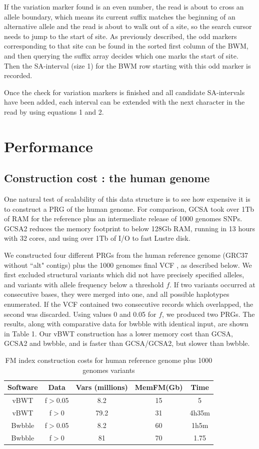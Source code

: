 \documentclass[runningheads,a4paper]{llncs}
\begin{document}
If the variation marker found is an even number, the read is about to cross an allele boundary, which means its current suffix matches the beginning of an alternative allele and the read is about to walk out of a site, so the search cursor needs to jump to the start of site. As previously described, the odd markers corresponding to that site can be found in the sorted first column of the BWM, and then querying the suffix array decides which one marks the start of site. Then the SA-interval (size 1) for the BWM row starting with this odd marker is recorded.

Once the check for variation markers is finished and all candidate SA-intervals have been added, each interval can be extended with the next character in the read by using equations 1 and 2.

\section{Performance}
\subsection{Construction cost : the human genome}
One natural test of scalability of this data structure is to see how expensive it is to construct a PRG of the human genome. For comparison, GCSA took over 1Tb of RAM for the reference plus an intermediate release of 1000 genomes SNPs. GCSA2 reduces the memory footprint to below 128Gb RAM, running in 13 hours with 32 cores, and using  over 1Tb of I/O to fast Lustre disk. 

We  constructed four different PRGs from the human reference genome (GRC37 without ``alt" contigs) plus the 1000 genomes final VCF \cite{1000g}, as described below. We first  excluded structural variants which did not have precisely specified alleles, and variants with allele frequency below a threshold $f$. If two variants occurred at consecutive bases, they were merged into one, and all possible haplotypes enumerated. If the VCF contained two consecutive records which overlapped, the second was discarded. Using values 0 and 0.05 for $f$, we produced two PRGs. The results, along with comparative data for bwbble with identical input,  are shown in Table 1. Our vBWT construction has a lower  memory cost than GCSA, GCSA2 and bwbble, and is faster than GCSA/GCSA2, but slower than bwbble. 

\begin{table}
\caption{FM index construction costs for human reference genome plus 1000 genomes variants}
\centering
\begin{tabular}{c c c c c}
\hline
Software & Data & Vars (millions) & MemFM(Gb) & Time\\
\hline
vBWT & f$>$0.05  & 8.2 &15  & 5 \\
vBWT & f$>$0   & 79.2 & 31 & 4h35m \\
\hline
Bwbble & f$>$0.05 & 8.2 & 60 &  1h5m \\ 
Bwbble & f$>$0 & 81 & 70 & 1.75 \\ 
\hline
\end{tabular}
\end{table}
\end{document}
